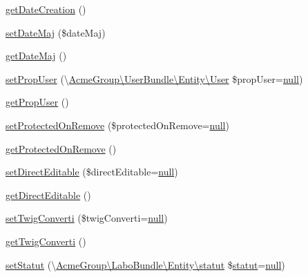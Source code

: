\begin{DoxyCompactItemize}
\item 
\hyperlink{class_acme_group_1_1_labo_bundle_1_1_entity_1_1richtext_aac9428eba27fd7b0e8e49964eabe15cd}{get\+Date\+Creation} ()
\item 
\hyperlink{class_acme_group_1_1_labo_bundle_1_1_entity_1_1richtext_a9625e7de98189a6a43af4436b19a6ca1}{set\+Date\+Maj} (\$date\+Maj)
\item 
\hyperlink{class_acme_group_1_1_labo_bundle_1_1_entity_1_1richtext_a1a233d8cbd7bc523ba664aa08b42e771}{get\+Date\+Maj} ()
\item 
\hyperlink{class_acme_group_1_1_labo_bundle_1_1_entity_1_1richtext_a1d5c7e39a2604f834c793ad9d207226c}{set\+Prop\+User} (\textbackslash{}\hyperlink{class_acme_group_1_1_user_bundle_1_1_entity_1_1_user}{Acme\+Group\textbackslash{}\+User\+Bundle\textbackslash{}\+Entity\textbackslash{}\+User} \$prop\+User=\hyperlink{validate_8js_afb8e110345c45e74478894341ab6b28e}{null})
\item 
\hyperlink{class_acme_group_1_1_labo_bundle_1_1_entity_1_1richtext_a0634db77ff8e393c4432bd390d43be1d}{get\+Prop\+User} ()
\item 
\hyperlink{class_acme_group_1_1_labo_bundle_1_1_entity_1_1richtext_aca0355e0a6602ab21fdd66bce86e0d21}{set\+Protected\+On\+Remove} (\$protected\+On\+Remove=\hyperlink{validate_8js_afb8e110345c45e74478894341ab6b28e}{null})
\item 
\hyperlink{class_acme_group_1_1_labo_bundle_1_1_entity_1_1richtext_a48a13a5107dbec19bfa99da505fdea3c}{get\+Protected\+On\+Remove} ()
\item 
\hyperlink{class_acme_group_1_1_labo_bundle_1_1_entity_1_1richtext_a0ea3034602708a2c8eb227959a264df0}{set\+Direct\+Editable} (\$direct\+Editable=\hyperlink{validate_8js_afb8e110345c45e74478894341ab6b28e}{null})
\item 
\hyperlink{class_acme_group_1_1_labo_bundle_1_1_entity_1_1richtext_acbffa4923eef5c6d3bb5cd9aa900d452}{get\+Direct\+Editable} ()
\item 
\hyperlink{class_acme_group_1_1_labo_bundle_1_1_entity_1_1richtext_a3a51f5d27ed2c0d7a592ffdb9aac218a}{set\+Twig\+Converti} (\$twig\+Converti=\hyperlink{validate_8js_afb8e110345c45e74478894341ab6b28e}{null})
\item 
\hyperlink{class_acme_group_1_1_labo_bundle_1_1_entity_1_1richtext_aaf05366618704dcee7732e6efa323ded}{get\+Twig\+Converti} ()
\item 
\hyperlink{class_acme_group_1_1_labo_bundle_1_1_entity_1_1richtext_aead5f1a51ba909026f6f4f6ba6f39322}{set\+Statut} (\textbackslash{}\hyperlink{class_acme_group_1_1_labo_bundle_1_1_entity_1_1statut}{Acme\+Group\textbackslash{}\+Labo\+Bundle\textbackslash{}\+Entity\textbackslash{}statut} \$\hyperlink{class_acme_group_1_1_labo_bundle_1_1_entity_1_1statut}{statut}=\hyperlink{validate_8js_afb8e110345c45e74478894341ab6b28e}{null})

\end{DoxyCompactItemize}
